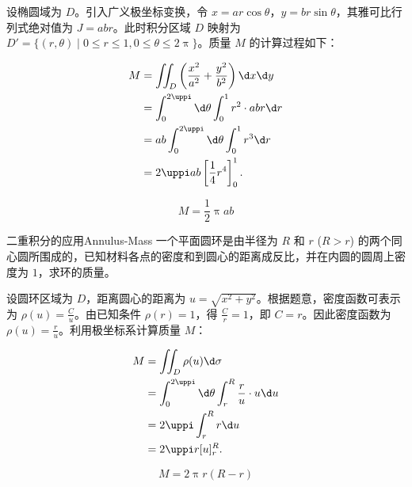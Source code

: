 \begin{solution}
    设椭圆域为 $D$。引入广义极坐标变换，令 $x = ar \cos \theta$，$y = br \sin \theta$，其雅可比行列式绝对值为 $J = abr$。此时积分区域 $D$ 映射为 $D' = \{(r, \theta) \mid 0 \leqslant r \leqslant 1, 0 \leqslant \theta \leqslant 2\uppi\}$。质量 $M$ 的计算过程如下：

    \begin{equation}
        \begin{aligned}
            M & = \iint_{D} \left( \frac{x^2}{a^2} + \frac{y^2}{b^2} \right) \d x \d y \\
              & = \int_{0}^{2\uppi} \d \theta \int_{0}^{1} r^2 \cdot abr \d r          \\
              & = ab \int_{0}^{2\uppi} \d \theta \int_{0}^{1} r^3 \d r                 \\
              & = 2\uppi ab \left[ \frac{1}{4} r^4 \right]_{0}^{1} .
        \end{aligned}
    \end{equation}

    \begin{equation}
        M = \boxed{\frac{1}{2} \uppi ab}
    \end{equation}
\end{solution}

\begin{problem}{二重积分的应用}{Annulus-Mass}
    一个平面圆环是由半径为 $R$ 和 $r$ ($R > r$) 的两个同心圆所围成的，已知材料各点的密度和到圆心的距离成反比，并在内圆的圆周上密度为 $1$，求环的质量。
\end{problem}

\begin{solution}
    设圆环区域为 $D$，距离圆心的距离为 $u = \sqrt{x^2 + y^2}$。根据题意，密度函数可表示为 $\rho(u) = \frac{C}{u}$。由已知条件 $\rho(r) = 1$，得 $\frac{C}{r} = 1$，即 $C = r$。因此密度函数为 $\rho(u) = \frac{r}{u}$。利用极坐标系计算质量 $M$：

    \begin{equation}
        \begin{aligned}
            M & = \iint_{D} \rho(u) \d \sigma                                       \\
              & = \int_{0}^{2\uppi} \d \theta \int_{r}^{R} \frac{r}{u} \cdot u \d u \\
              & = 2\uppi \int_{r}^{R} r \d u                                        \\
              & = 2\uppi r [u]_{r}^{R} .
        \end{aligned}
    \end{equation}

    \begin{equation}
        M = \boxed{2\uppi r (R - r)}
    \end{equation}
\end{solution}

